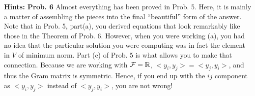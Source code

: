 \documentclass[letterpaper]{article}
\begin{document}
\newpage


\noindent \textbf{Hints: Prob. 6 }
Almost everything has been proved in Prob. 5. Here, it is mainly a matter of assembling the pieces into the final ``beautiful'' form of the answer. Note that in Prob. 5, part(a), you derived equations that look remarkably like those in the Theorem of Prob. 6. However, when you were working (a), you had no idea that the particular solution you were computing was in fact the element in $V$ of minimum norm. Part (c) of Prob. 5 is what allows you to make that connection. Because we are working with ${\cal F} = \mathbb R$, $<y_i, y_j> = <y_j, y_i>$, and thus the Gram matrix is symmetric. Hence, if you end up with the $ij$ component as $<y_i, y_j>$ instead of $<y_j, y_i>$, you are not wrong!

\vspace{1cm}
\end{document}
